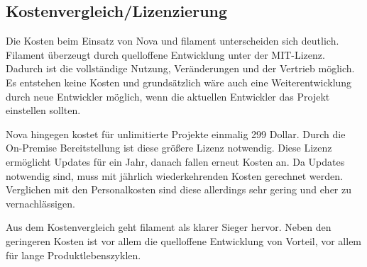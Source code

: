 \subsection{Kostenvergleich/Lizenzierung}
Die Kosten beim Einsatz von Nova und filament unterscheiden sich deutlich.
Filament überzeugt durch quelloffene Entwicklung unter der MIT-Lizenz.
Dadurch ist die vollständige Nutzung, Veränderungen und der Vertrieb möglich.
Es entstehen keine Kosten und grundsätzlich wäre auch eine Weiterentwicklung durch neue Entwickler möglich, wenn die aktuellen Entwickler das Projekt einstellen sollten.

Nova hingegen kostet für unlimitierte Projekte einmalig 299 Dollar.
Durch die On-Premise Bereitstellung ist diese größere Lizenz notwendig.
Diese Lizenz ermöglicht Updates für ein Jahr, danach fallen erneut Kosten an.
Da Updates notwendig sind, muss mit jährlich wiederkehrenden Kosten gerechnet werden.
Verglichen mit den Personalkosten sind diese allerdings sehr gering und eher zu vernachlässigen.

Aus dem Kostenvergleich geht filament als klarer Sieger hervor.
Neben den geringeren Kosten ist vor allem die quelloffene Entwicklung von Vorteil, vor allem für lange Produktlebenszyklen.
